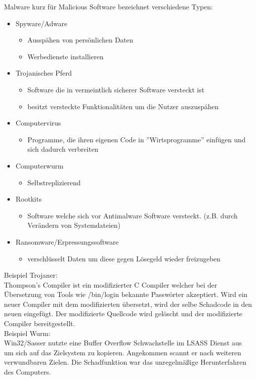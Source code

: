 \documentclass[a4paper,12pt,leqno]{article}
\begin{document}
Malware kurz für Malicious Software bezeichnet verschiedene Typen:
\begin{itemize}
\item Spyware/Adware
	\begin{itemize}
	\item Ausspähen von persönlichen Daten
	\item Werbedienste installieren
	\end{itemize}
\item Trojanisches Pferd
	\begin{itemize}
	\item Software die in vermeintlich sicherer Software versteckt ist
	\item besitzt versteckte Funktionalitäten um die Nutzer auszuspähen
	\end{itemize}
\item Computervirus
	\begin{itemize}
	\item Programme, die ihren eigenen Code in ''Wirtsprogramme'' einfügen und sich dadurch verbreiten
	\end{itemize}
\item Computerwurm
	\begin{itemize}
	\item Selbstreplizierend
	\end{itemize}
\item Rootkits
	\begin{itemize}
	\item Software welche sich vor Antimalware Software versteckt. (z.B. durch Verändern von Systemdateien)
	\end{itemize}
\item Ransomware/Erpressungssoftware
	\begin{itemize}
	\item verschlüsselt Daten um diese gegen Lösegeld wieder freizugeben
	\end{itemize}
\end{itemize}
Beispiel Trojaner:\\
Thompson's Compiler ist ein modifizierter C Compiler welcher bei der Übersetzung von Tools wie /bin/login bekannte Passwörter akzeptiert. Wird ein neuer Compiler mit dem modifizierten übersetzt, wird der selbe Schadcode in den neuen eingefügt. Der modifizierte Quellcode wird gelöscht und der modifizierte Compiler bereitgestellt.\\

Beispiel Wurm:\\
Win32/Sasser nutzte eine Buffer Overflow Schwachstelle im LSASS Dienst aus um sich auf das Zielsystem zu kopieren. Angekommen scannt er nach weiteren verwundbaren Zielen. Die Schadfunktion war das unregelmäßige Herunterfahren des Computers.\\
\end{document}
